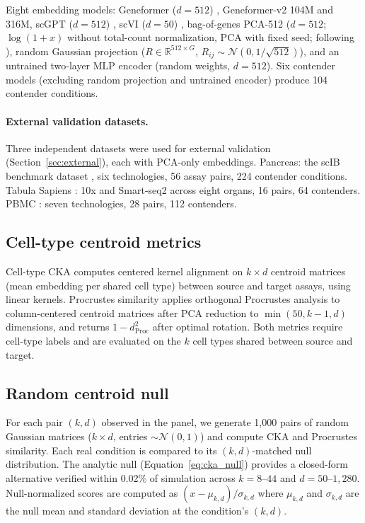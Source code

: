 \documentclass[11pt]{article}
\begin{document}
Eight embedding models: Geneformer ($d = 512$)
\citep{theodoris2023geneformer}, Geneformer-v2 104M and 316M,
scGPT ($d = 512$) \citep{cui2024scgpt}, scVI ($d = 50$)
\citep{lopez2018scvi}, bag-of-genes PCA-512 ($d = 512$;
$\log(1 + x)$ without total-count normalization, PCA with fixed seed;
following \citealp{cole2026morpheus}), random Gaussian projection
($R \in \mathbb{R}^{512 \times G}$, $R_{ij} \sim \mathcal{N}(0,
1/\sqrt{512})$), and an untrained two-layer MLP encoder (random weights,
$d = 512$). Six contender models (excluding random projection and
untrained encoder) produce 104 contender conditions.

\paragraph{External validation datasets.} Three independent datasets
were used for external validation (Section~\ref{sec:external}), each
with PCA-only embeddings. Pancreas: the scIB benchmark dataset
\citep{luecken2022scib}, six technologies, 56 assay pairs, 224
contender conditions. Tabula Sapiens \citep{tabulasapiens2022}: 10x and
Smart-seq2 across eight organs, 16 pairs, 64 contenders. PBMC
\citep{ding2020systematic}: seven technologies, 28 pairs, 112
contenders.

\subsection{Cell-type centroid metrics}

Cell-type CKA \citep{kornblith2019similarity} computes centered kernel
alignment on $k \times d$ centroid matrices (mean embedding per shared
cell type) between source and target assays, using linear kernels.
Procrustes similarity applies orthogonal Procrustes analysis to
column-centered centroid matrices after PCA reduction to $\min(50,
k-1, d)$ dimensions, and returns $1 - d_{\mathrm{Proc}}^2$ after
optimal rotation. Both metrics require cell-type labels and are
evaluated on the $k$ cell types shared between source and target.

\subsection{Random centroid null}

For each pair $(k, d)$ observed in the panel, we generate 1,000 pairs
of random Gaussian matrices ($k \times d$, entries $\sim
\mathcal{N}(0,1)$) and compute CKA and Procrustes similarity. Each real
condition is compared to its $(k, d)$-matched null distribution. The
analytic null (Equation~\ref{eq:cka_null}) provides a closed-form
alternative verified within 0.02\% of simulation across $k = 8$--$44$
and $d = 50$--$1{,}280$. Null-normalized scores are computed as
$(x - \mu_{k,d}) / \sigma_{k,d}$ where $\mu_{k,d}$ and $\sigma_{k,d}$
are the null mean and standard deviation at the condition's $(k, d)$.
\end{document}
